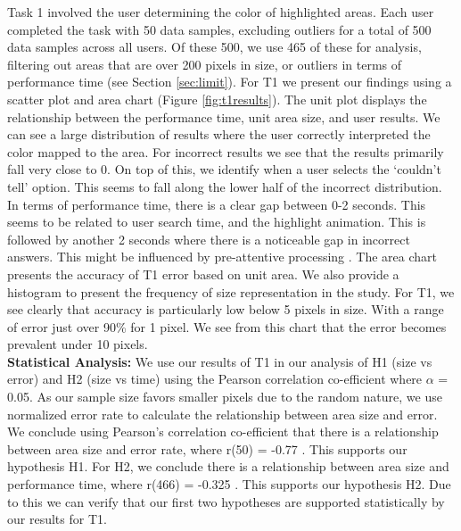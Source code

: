 Task 1 involved the user determining the color of highlighted areas. Each user completed the task with 50 data samples, excluding outliers for a total of 500 data samples across all users. Of these 500, we use 465 of these for analysis, filtering out areas that are over 200 pixels in size, or outliers in terms of performance time (see Section \ref{sec:limit}). For T1 we present our findings using a scatter plot and area chart (Figure \ref{fig:t1results}). The unit plot displays the relationship between the performance time, unit area size, and user results. We can see a large distribution of results where the user correctly interpreted the color mapped to the area. For incorrect results we see  that the results primarily fall very close to 0. On top of this, we identify when a user selects the `couldn't tell' option. This seems to fall along the lower half of the incorrect distribution. In terms of performance time, there is a clear gap between 0-2 seconds. This seems to be related to user search time, and the highlight animation. This is followed by another 2 seconds where there is a noticeable gap in incorrect answers. This might be influenced by pre-attentive processing . The area chart presents the accuracy of T1 error based on unit area. We also provide a histogram to present the frequency of size representation in the study. For T1, we see clearly that accuracy is particularly low below 5 pixels in size. With a range of error just over 90\% for 1 pixel. We see from this chart that the error becomes prevalent under 10 pixels. \\
\textbf{Statistical Analysis: } We use our results of T1 in our analysis of H1 (size vs error) and H2 (size vs time) using the Pearson correlation co-efficient where $\alpha$ = 0.05. As our sample size favors smaller pixels due to the random nature, we use normalized error rate to calculate the relationship between area size and error.  We conclude using Pearson's correlation co-efficient that there is a relationship between area size and error rate, where r(50) = -0.77%
. This supports our hypothesis H1. For H2, we conclude there is a relationship between area size and performance time, where r(466) = -0.325%
. This supports our hypothesis H2. Due to this we can verify that our first two hypotheses are supported statistically by our results for T1. 

